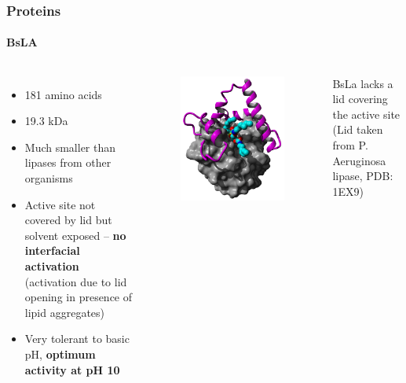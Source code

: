 \documentclass[english]{beamer}
\begin{document}
\begin{frame}
    \frametitle{Proteins}
    \framesubtitle{BsLA}

    \begin{columns}[t]
        \begin{itemize}
            \item 181 amino acids
            \item 19.3 kDa
            \item Much smaller than lipases from other organisms
            \item Active site not covered by lid but solvent exposed -- \textbf{no interfacial activation} (activation due to lid opening in presence of lipid aggregates)
            \item Very tolerant to basic pH, \textbf{optimum activity at pH 10}
        \end{itemize} 

        \begin{figure}
            \includegraphics[width=\linewidth]{figures/Lipase_Lid.png}
        \end{figure}     
        \tiny BsLa lacks a lid covering the active site (Lid taken from P. Aeruginosa lipase, PDB: 1EX9)

    \end{columns} 

\end{frame} 
\end{document}
